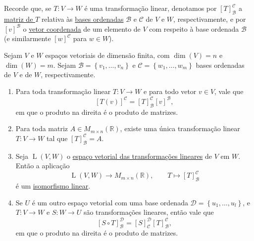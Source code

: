 Recorde que, se $T\colon V\to W$ é uma transformação linear, denotamos por $[T]_{\mathcal{B}}^{\mathcal{C}}$ a \href{http://mtm.ufsc.br/~cordeiro/ensino/mtm3112.algebra.linear/15.matrizes.trans.lin/con_rep_matr_trans_lin_moodle.html}{matriz de $T$} relativa às \href{../14.iso.lin/con_base_ord_moodle.html}{bases ordenadas} $\mathcal{B}$ e $\mathcal{C}$ de $V$ e $W$, respectivamente, e por $[v]^{\mathcal{B}}$ o \href{../14.iso.lin/con_vetor_coordenada_moodle.html}{vetor coordenada} de um elemento de $V$ com respeito à base ordenada $\mathcal{B}$ (e similarmente $[w]^{\mathcal{C}}$ para $w\in W$).

\begin{theorem}
	Sejam $V$ e $W$ espaços vetoriais de dimensão finita, com $\dim(V)=n$ e $\dim(W)=m$. Sejam $\mathcal{B}=\left\{v_1,\ldots,v_n\right\}$ e $\mathcal{C}=\left\{w_1,\ldots,w_m\right\}$ bases ordenadas de $V$ e de $W$, respectivamente. 
	\begin{enumerate}
		\item Para toda transformação linear $T\colon V\to W$ e para todo vetor $v\in V$, vale que
		\[[T(v)]^{\mathcal{C}}=[T]_{\mathcal{B}}^{\mathcal{C}}[v]^{\mathcal{B}},\]
		em que o produto na direita é o produto de matrizes.
		\item Para toda matriz $A\in M_{m\times n}(\mathbb{R})$, existe uma única transformação linear $T\colon V\to W$ tal que $[T]_{\mathcal{B}}^{\mathcal{C}}=A$.
		\item Seja $\operatorname{L}(V,W)$ o \href{../15.matrizes.trans.lin/con_soma_mult_trans_lin_moodle.html}{espaço vetorial das transformações lineares} de $V$ em $W$. Então a aplicação
		\[\operatorname{L}(V,W)\to M_{m\times n}(\mathbb{R}),\qquad T\mapsto [T]_{\mathcal{B}}^{\mathcal{C}}\]
		é um \href{../14.iso.lin/con_iso_moodle.html}{isomorfismo linear}.
		\item Se $U$ é um outro espaço vetorial com uma base ordenada $\mathcal{D}=\left\{u_1,\ldots,u_l\right\}$, e $T\colon V\to W$ e $S\colon W\to U$ são transformações lineares, então vale que
		\[[S\circ T]_{\mathcal{B}}^{\mathcal{D}}=[S]_{\mathcal{C}}^{\mathcal{D}}[T]_{\mathcal{B}}^{\mathcal{C}},\]
		em que o produto na direita é o produto de matrizes.
	\end{enumerate}
\end{theorem}

